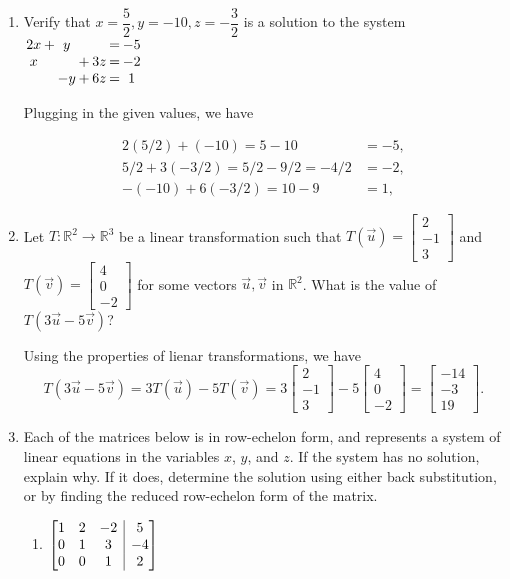 \documentclass[12pt]{article}
\makeatletter
\newcommand{\points}[1]{\marginpar{\hspace{24pt}[#1]}}
\newcommand{\R}{\mathbb{R}}
\newcommand{\bbm}{\begin{bmatrix}}
\newcommand{\ebm}{\end{bmatrix}}
\newenvironment{amatrix}[1]{%
  \left[\begin{array}{@{}*{#1}{c}|c@{}}
}{%
  \end{array}\right]
}
\makeatother
\begin{document}
\begin{enumerate}
\item Verify that $x=\dfrac{5}{2}, y=-10, z=-\dfrac{3}{2}$ is a solution to the system \points{4} \hspace{12pt} $\arraycolsep=1pt
 \begin{array}{ccccccc}
  2x&+&y& & &=&-5\\x& & &+&3z&=&-2\\ & &-y&+&6z&=&1
 \end{array}
$


\bigskip

Plugging in the given values, we have

\begin{align*}
 2(5/2)+(-10) = 5-10 &= -5, \tag*{so the first equation works}\\
 5/2 + 3(-3/2) = 5/2-9/2 = -4/2&=-2, \tag*{so the second equation works}\\
 -(-10)+6(-3/2) = 10-9 &= 1, \tag*{so the third equation works}
\end{align*}

\medskip


\item Let $T:\R^2\to\R^3$ be a linear transformation such that $T(\vec{u}) = \bbm 2\\-1\\3\ebm$ and $T(\vec{v}) = \bbm 4\\0\\-2\ebm$ for some vectors $\vec{u}, \vec{v}$ in $\R^2$. What is the value of \points{4} $T(3\vec{u}-5\vec{v})$?

\bigskip

Using the properties of lienar transformations, we have
\[
 T(3\vec{u}-5\vec{v}) = 3T(\vec{u})-5T(\vec{v}) = 3\bbm 2\\-1\\3\ebm-5\bbm 4\\0\\-2\ebm =\bbm -14\\-3\\19\ebm.
\]

\newpage

\item Each of the matrices below is in row-echelon form, and represents a system of linear equations in the variables $x$, $y$, and $z$. If the system has no solution, explain why. If it does, determine the solution using either back substitution, or by finding the reduced row-echelon form of the matrix.\points{10}
\begin{enumerate}
 \item $\begin{amatrix}{3}1&2&-2&5\\0&1&3&-4\\0&0&1&2\end{amatrix}$ 


\end{enumerate}
\end{enumerate}
\end{document}
